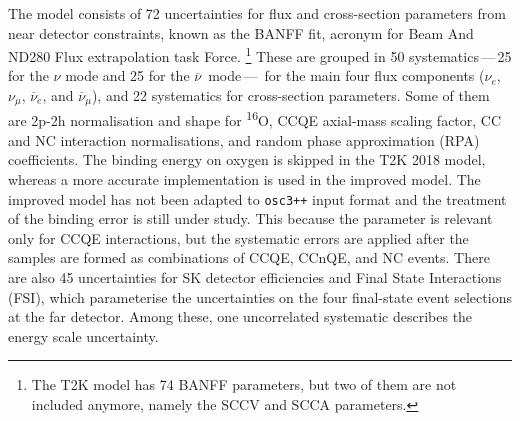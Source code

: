 \documentclass[a4paper, 11pt]{article}
\newcommand{\cj}{\overline}
\newcommand{\tapi}{\textsuperscript}
\begin{document}
The model consists of 72 uncertainties for flux and cross-section parameters from near detector constraints, %
known as the BANFF fit, acronym for Beam And ND280 Flux extrapolation task Force.%
\footnote{The T2K model has 74 BANFF parameters, but two of them are not included anymore, namely the SCCV and SCCA parameters.}
These are grouped in 50 systematics\,---\,25 for the $\nu$ mode and 25 for the $\cj{\nu}$~mode\,---\,%
for the main four flux components ($\nu_e$, $\nu_\mu$, $\cj{\nu}_e$, and $\cj{\nu}_\mu$), %
and 22 systematics for cross-section parameters.
Some of them are 2p-2h normalisation and shape for \tapi{16}O, CCQE axial-mass scaling factor, %
CC and NC interaction normalisations, and random phase approximation (RPA) coefficients.
The binding energy on oxygen is skipped in the T2K 2018 model, whereas a more accurate implementation is used in the improved model.
The improved model has not been adapted to \texttt{osc3++} input format and the treatment of the binding error is still under study.
This because the parameter is relevant only for CCQE interactions, but the systematic errors are applied %
after the samples are formed as combinations of CCQE, CCnQE, and NC events.
There are also 45 uncertainties for SK detector efficiencies and Final State Interactions (FSI),
which parameterise the uncertainties on the four final-state event selections at the far detector. %
Among these, one uncorrelated systematic describes the energy scale uncertainty.
\end{document}
